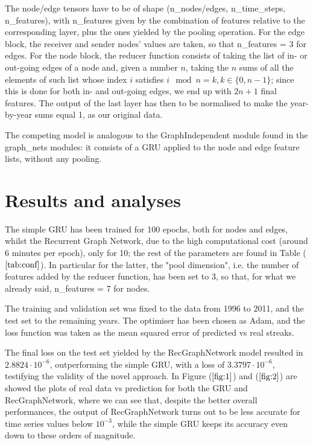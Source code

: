 \documentclass{article}
\begin{document}
The node/edge tensors have to be of shape (n\_nodes/edges, n\_time\_steps, n\_features), with n\_features given by the combination of features relative to the corresponding layer, plus the ones yielded by the pooling operation. For the edge block, the receiver and sender nodes' values are taken, so that n\_features = 3 for edges. For the node block, the reducer function consists of taking the list of in- or out-going edges of a node and, given a number $n$, taking the $n$ sums of all the elements of such list whose index $i$ satisfies $i \mod{n} = k, k \in \{0, n-1\}$; since this is done for both in- and out-going edges, we end up with $2n + 1$ final features. The output of the last layer has then to be normalised to make the year-by-year sums equal 1, as our original data.

The competing model is analogous to the GraphIndependent module found in the graph\_nets modules: it consists of a GRU applied to the node and edge feature lists, without any pooling.

\section{Results and analyses}
 The simple GRU has been trained for 100 epochs, both for nodes and edges, whilst the Recurrent Graph Network, due to the high computational cost (around 6 minutes per epoch), only for 10; the rest of the parameters are found in Table ($\ref{tab:conf}$). In particular for the latter, the "pool dimension", i.e. the number of features added by the reducer function, has been set to 3, so that, for what we already said, n\_features = 7 for nodes.
 
 The training and validation set was fixed to the data from 1996 to 2011, and the test set to the remaining years. The optimiser has been chosen as Adam, and the loss function was taken as the mean squared error of predicted vs real streaks.

The final loss on the test set yielded by the RecGraphNetwork model resulted in $2.8824 \cdot 10^{-6}$, outperforming the simple GRU, with a loss of $3.3797 \cdot 10^{-6}$, testifying the validity of the novel approach. In Figure ($\ref{fig:1}$) and ($\ref{fig:2}$) are showed the plots of real data vs prediction for both the GRU and RecGraphNetwork, where we can see that, despite the better overall performances, the output of RecGraphNetwork turns out to be less accurate for time series values below $10^{-3}$, while the simple GRU keeps its accuracy even down to these orders of magnitude.
\end{document}
